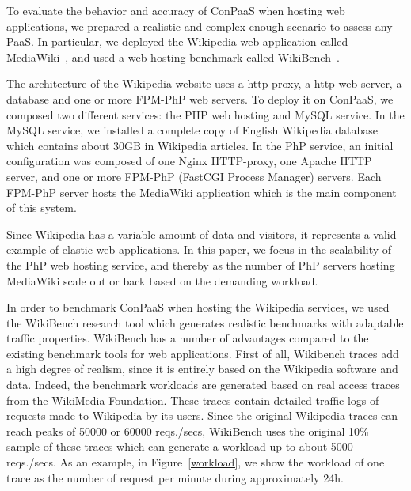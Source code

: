 To evaluate the behavior and accuracy of ConPaaS when hosting web applications, we prepared a realistic and complex enough scenario to assess any PaaS. In particular, we deployed the Wikipedia web application called MediaWiki~\cite{mediawiki}, and used a web hosting benchmark called WikiBench~\cite{wikibench}. 


The architecture of the Wikipedia website uses a http-proxy, a http-web server, a database and one or more FPM-PhP web servers. To deploy it on ConPaaS, we composed two different services: the PHP web hosting and MySQL service. In the MySQL service, we installed a complete copy of English Wikipedia database which contains about 30GB in Wikipedia articles. In the PhP service, an initial configuration was composed of one Nginx HTTP-proxy, one Apache HTTP server, and one or more FPM-PhP (FastCGI Process Manager) servers. Each FPM-PhP server hosts the MediaWiki application which is the main component of this system. 

Since Wikipedia has a variable amount of data and visitors, it represents a valid example of elastic web applications. In this paper, we focus in the scalability of the PhP web hosting service, and thereby as the number of PhP servers hosting MediaWiki scale out or back based on the demanding workload.

In order to benchmark ConPaaS when hosting the Wikipedia services, we used the WikiBench research tool which generates realistic benchmarks with adaptable traffic properties. WikiBench has a number of advantages compared to the existing benchmark tools for web applications. First of all, Wikibench traces add a high degree of realism, since it is entirely based on the Wikipedia software and data. Indeed, the benchmark workloads are generated based on real access traces from the WikiMedia Foundation. These traces contain detailed  traffic logs of requests made to Wikipedia by its users. Since the original Wikipedia traces can reach peaks of 50000 or 60000 reqs./secs, WikiBench uses the original 10\% sample of these traces which can generate a workload up to about 5000 reqs./secs. As an example, in Figure~\ref{workload}, we show the workload of one trace as the number of request per minute during approximately 24h. 



